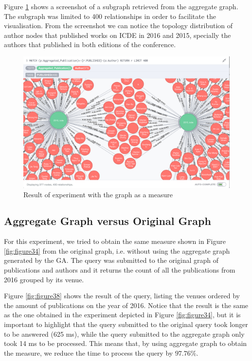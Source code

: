 Figure \ref{fig:figure37} shows a screenshot of a subgraph retrieved from the aggregate graph. The subgraph was limited to 400 relationships in order to facilitate the visualisation. From the screenshot we can notice the topology distribution of author nodes that published works on ICDE in 2016 and 2015, specially the authors that published in both editions of the conference.

\begin{figure}[!h]
\centering
\includegraphics[width=1\textwidth]{../graph_measure.png}
\caption{Result of experiment with the graph as a measure}
\label{fig:figure37}
\end{figure}

\subsection{Aggregate Graph versus Original Graph}
For this experiment, we tried to obtain the same measure shown in Figure \ref{fig:figure34} from the original graph, i.e. without using the aggregate graph generated by the GA. The query was submitted to the original graph of publications and authors and it returns the count of all the publications from 2016 grouped by its venue.

Figure \ref{fig:figure38} shows the result of the query, listing the venues ordered by the amount of publications on the year of 2016. Notice that the result is the same as the one obtained in the experiment depicted in Figure \ref{fig:figure34}, but it is important to highlight that the query submitted to the original query took longer to be answered (625 ms), while the query submitted to the aggregate graph only took 14 ms to be processed. This means that, by using aggregate graph to obtain the measure, we reduce the time to process the query by $97.76\%$.

